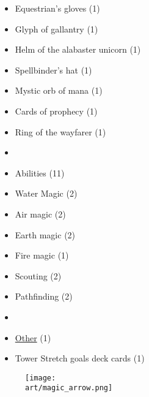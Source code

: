\begin{multicols}{3}
\begin{itemize}[leftmargin=0pt, label={}, noitemsep, noitemsep]
  \item Equestrian's gloves (1)
  \item Glyph of gallantry (1)
  \item Helm of the alabaster unicorn (1)
  \item Spellbinder's hat (1)
  \item Mystic orb of mana (1)
  \item Cards of prophecy (1)
  \item Ring of the wayfarer (1)
  \item
  \item Abilities (11)
  \item Water Magic (2)
  \item Air magic (2)
  \item Earth magic (2)
  \item Fire magic (1)
  \item Scouting (2)
  \item Pathfinding (2)
  \item
  \item \underline{Other} (1)
  \item Tower Stretch goals deck cards (1)
\end{itemize}

\end{multicols}

\vfill
\begin{figure*}[!hb]
  \centering
  \texttt{[image: \\art/magic\_arrow.png]}
\end{figure*}
\vfill
